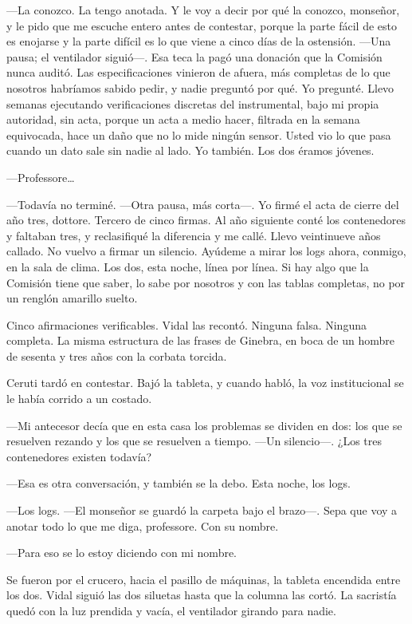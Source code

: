 ---La conozco. La tengo anotada. Y le voy a decir por qué la conozco, monseñor, y le pido que me escuche entero antes de contestar, porque la parte fácil de esto es enojarse y la parte difícil es lo que viene a cinco días de la ostensión. ---Una pausa; el ventilador siguió---. Esa teca la pagó una donación que la Comisión nunca auditó. Las especificaciones vinieron de afuera, más completas de lo que nosotros habríamos sabido pedir, y nadie preguntó por qué. Yo pregunté. Llevo semanas ejecutando verificaciones discretas del instrumental, bajo mi propia autoridad, sin acta, porque un acta a medio hacer, filtrada en la semana equivocada, hace un daño que no lo mide ningún sensor. Usted vio lo que pasa cuando un dato sale sin nadie al lado. Yo también. Los dos éramos jóvenes.

---Professore\ldots{}

---Todavía no terminé. ---Otra pausa, más corta---. Yo firmé el acta de cierre del año tres, dottore. Tercero de cinco firmas. Al año siguiente conté los contenedores y faltaban tres, y reclasifiqué la diferencia y me callé. Llevo veintinueve años callado. No vuelvo a firmar un silencio. Ayúdeme a mirar los logs ahora, conmigo, en la sala de clima. Los dos, esta noche, línea por línea. Si hay algo que la Comisión tiene que saber, lo sabe por nosotros y con las tablas completas, no por un renglón amarillo suelto.

Cinco afirmaciones verificables. Vidal las recontó. Ninguna falsa. Ninguna completa. La misma estructura de las frases de Ginebra, en boca de un hombre de sesenta y tres años con la corbata torcida.

Ceruti tardó en contestar. Bajó la tableta, y cuando habló, la voz institucional se le había corrido a un costado.

---Mi antecesor decía que en esta casa los problemas se dividen en dos: los que se resuelven rezando y los que se resuelven a tiempo. ---Un silencio---. ¿Los tres contenedores existen todavía?

---Esa es otra conversación, y también se la debo. Esta noche, los logs.

---Los logs. ---El monseñor se guardó la carpeta bajo el brazo---. Sepa que voy a anotar todo lo que me diga, professore. Con su nombre.

---Para eso se lo estoy diciendo con mi nombre.

Se fueron por el crucero, hacia el pasillo de máquinas, la tableta encendida entre los dos. Vidal siguió las dos siluetas hasta que la columna las cortó. La sacristía quedó con la luz prendida y vacía, el ventilador girando para nadie.

